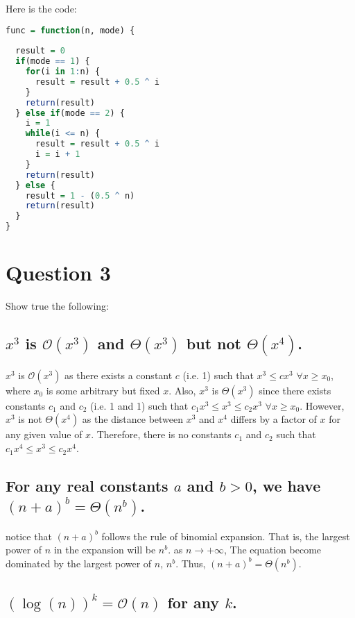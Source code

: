 \documentclass[20pt]{article} %
\begin{document}
Here is the code:

\begin{lstlisting}[language=R]
func = function(n, mode) {
  
  result = 0
  if(mode == 1) {
    for(i in 1:n) {
      result = result + 0.5 ^ i
    }
    return(result)
  } else if(mode == 2) {
    i = 1
    while(i <= n) {
      result = result + 0.5 ^ i
      i = i + 1
    }
    return(result)
  } else {
    result = 1 - (0.5 ^ n)
    return(result)
  }
}
\end{lstlisting}

\section{Question 3}
Show true the following: 

\subsection{$x^{3}$ is $\mathcal{O}(x^{3})$ and $\Theta(x^{3})$ but not $\Theta(x^{4})$.}

$x^{3}$ is $\mathcal{O}(x^{3})$ as there exists a constant $c$ (i.e. 1) such that $x^{3} \leq cx^{3}$  $\forall x \geq x_0$, where $x_0$ is some arbitrary but fixed $x$. Also,  $x^{3}$ is $\Theta(x^{3})$ since there exists constants $c_1$ and $c_2$ (i.e. 1 and 1) such that $c_1x^{3} \leq x^{3} \leq c_2x^{3}$  $\forall x \geq x_0$.  However, $x^{3}$ is not $\Theta(x^{4})$ as the distance between $x^{3}$ and $x^{4}$ differs by a factor of $x$ for any given value of $x$.  Therefore, there is no constants $c_1$ and $c_2$ such that $c_1x^{4} \leq x^{3} \leq c_2x^{4}$.

\subsection{For any real constants $a$ and $b>0$, we have $(n+a)^{b} = \Theta(n^{b})$.}

notice that $(n+a)^{b}$ follows the rule of binomial expansion. That is, the largest power of $n$ in the expansion will be $n^{b}$.  as $n\rightarrow +\infty$, The equation become dominated by the largest power of $n$, $n^{b}$.  Thus, $(n+a)^{b} = \Theta(n^{b})$.

\subsection{$(\log(n))^{k} = \mathcal{O}(n)$ for any $k$.}
\end{document}
